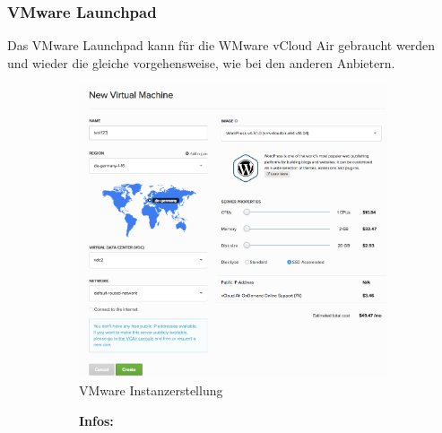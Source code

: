 \subsubsection{VMware Launchpad\autocite{vmware}}
Das VMware Launchpad kann für die WMware vCloud Air gebraucht werden und wieder 
die gleiche vorgehensweise, wie bei den anderen Anbietern.
\begin{figure}[!htbp]
   \begin{subfigure}[b]{.6\textwidth}

\includegraphics[width=\textwidth]{./03_Analyse/03_Bitnami/images/vmware_creation}
\caption{VMware Instanzerstellung}
   \end{subfigure}
     \hfill
   \begin{subfigure}[b]{.39\textwidth}
  \centering
\textbf{Infos:}\\

\end{subfigure}
\end{figure}
